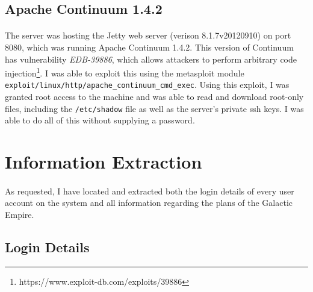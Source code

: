 \documentclass{article}
\begin{document}
\subsection{Apache Continuum 1.4.2}
\paragraph{}
The server was hosting the Jetty web server (verison 8.1.7v20120910) on port 8080, which was running Apache Continuum 1.4.2.
This version of Continuum has vulnerability \emph{EDB-39886}, which allows attackers to perform arbitrary code injection\footnote{https://www.exploit-db.com/exploits/39886}.
I was able to exploit this using the metasploit module \texttt{exploit/linux/http/apache\_continuum\_cmd\_exec}.
Using this exploit, I was granted root access to the machine and was able to read and download root-only files, including the \texttt{/etc/shadow} file as well as the server's private ssh keys.
I was able to do all of this without supplying a password.

\newpage

\section{Information Extraction}
\paragraph{}
As requested, I have located and extracted both the login details of every user account on the system and all information regarding the plans of the Galactic Empire.

\subsection{Login Details}
\end{document}
